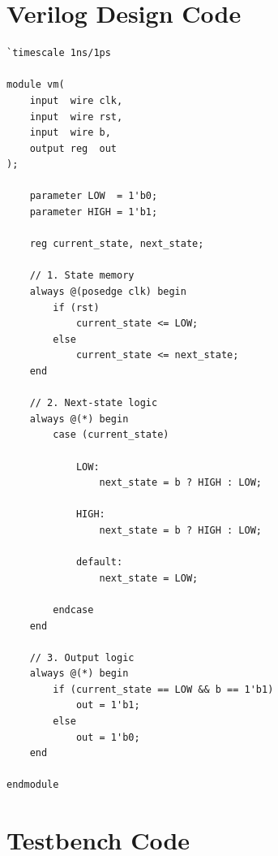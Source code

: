 \documentclass[12pt,a4paper]{report}
\begin{document}
\section{Verilog Design Code}

\begin{verilogbox}
\begin{lstlisting}
`timescale 1ns/1ps

module vm(
    input  wire clk,
    input  wire rst,
    input  wire b,
    output reg  out
);

    parameter LOW  = 1'b0;
    parameter HIGH = 1'b1;

    reg current_state, next_state;

    // 1. State memory
    always @(posedge clk) begin
        if (rst)
            current_state <= LOW;
        else
            current_state <= next_state;
    end

    // 2. Next-state logic
    always @(*) begin
        case (current_state)

            LOW:
                next_state = b ? HIGH : LOW;

            HIGH:
                next_state = b ? HIGH : LOW;

            default:
                next_state = LOW;

        endcase
    end

    // 3. Output logic
    always @(*) begin
        if (current_state == LOW && b == 1'b1)
            out = 1'b1;
        else
            out = 1'b0;
    end

endmodule
\end{lstlisting}
\end{verilogbox}

\section{Testbench Code}
\end{document}
